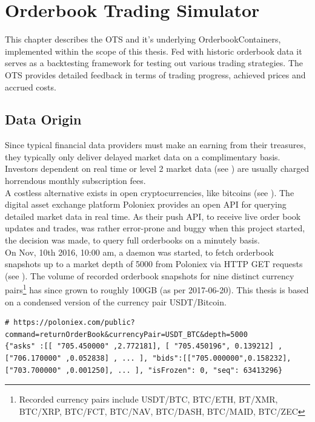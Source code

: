 \chapter{Orderbook Trading Simulator}
\label{chap:simulator}
This chapter describes the \ac{OTS} and it's underlying OrderbookContainers, implemented within the scope of this thesis. Fed with historic orderbook data it serves as a backtesting framework for testing out various trading strategies. The \ac{OTS} provides detailed feedback in terms of trading progress, achieved prices and accrued costs.

\section{Data Origin}
\label{chap:dataorigin}
Since typical financial data providers must make an earning from their treasures, they typically only deliver delayed market data on a complimentary basis. Investors dependent on real time or level 2 market data (see ) are usually charged horrendous monthly subscription fees.\\

A costless alternative exists in open cryptocurrencies, like bitcoins (see ). The digital asset exchange platform Poloniex \cite{poloniex} provides an open API for querying detailed market data in real time. As their push API, to receive live order book updates and trades, was rather error-prone and buggy when this project started, the decision was made, to query full orderbooks on a minutely basis.\\

On Nov, 10th 2016, 10:00 am, a daemon was started, to fetch orderbook snapshots up to a market depth of 5000 from Poloniex via HTTP GET requests (see ). The volume of recorded orderbook snapshots for nine distinct currency pairs\footnote{Recorded currency pairs include USDT/BTC, BTC/ETH, BT/XMR, BTC/XRP, BTC/FCT, BTC/NAV, BTC/DASH, BTC/MAID, BTC/ZEC} has since grown to roughly 100GB (as per 2017-06-20). This thesis is based on a condensed version of the currency pair USDT/Bitcoin.

\begin{lstlisting}[frame=single, breaklines=true, basicstyle=\scriptsize, caption=Data fetched from Poloniex via HTTP GET request, label=lst:PoloniexFetch]
# https://poloniex.com/public?command=returnOrderBook&currencyPair=USDT_BTC&depth=5000
{"asks" :[[ "705.450000" ,2.772181], [ "705.450196", 0.139212] ,["706.170000" ,0.052838] , ... ], "bids":[["705.000000",0.158232],["703.700000" ,0.001250], ... ], "isFrozen": 0, "seq": 63413296}
\end{lstlisting}

